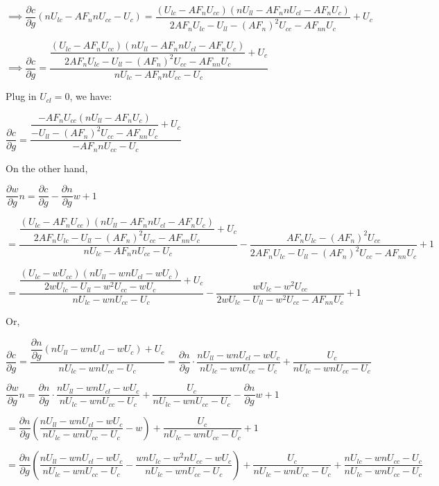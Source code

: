 \documentclass{article}
\begin{document}
$\implies \dfrac{\partial c}{\partial g}\left(nU_{lc}-AF_{n}nU_{cc}-U_{c}\right)=\dfrac{\left(U_{lc}-AF_{n}U_{cc}\right)\left(nU_{ll}-AF_{n}nU_{cl}-AF_{n}U_{c}\right)}{2AF_{n}U_{lc}-U_{ll}-\left(AF_{n}\right)^2U_{cc}-AF_{nn}U_{c}}+U_{c}$

$\implies \boxed{\dfrac{\partial c}{\partial g}=\dfrac{\dfrac{\left(U_{lc}-AF_{n}U_{cc}\right)\left(nU_{ll}-AF_{n}nU_{cl}-AF_{n}U_{c}\right)}{2AF_{n}U_{lc}-U_{ll}-\left(AF_{n}\right)^2U_{cc}-AF_{nn}U_{c}}+U_{c}}{nU_{lc}-AF_{n}nU_{cc}-U_{c}}}$

Plug in $U_{cl}=0$, we have:

$\boxed{\dfrac{\partial c}{\partial g}=\dfrac{\dfrac{-AF_{n}U_{cc}\left(nU_{ll}-AF_{n}U_{c}\right)}{-U_{ll}-\left(AF_{n}\right)^2U_{cc}-AF_{nn}U_{c}}+U_{c}}{-AF_{n}nU_{cc}-U_{c}}}$

On the other hand, 

$\dfrac{\partial w}{\partial g}n=\dfrac{\partial c}{\partial g}-\dfrac{\partial n}{\partial g}w+1$

$=\dfrac{\dfrac{\left(U_{lc}-AF_{n}U_{cc}\right)\left(nU_{ll}-AF_{n}nU_{cl}-AF_{n}U_{c}\right)}{2AF_{n}U_{lc}-U_{ll}-\left(AF_{n}\right)^2U_{cc}-AF_{nn}U_{c}}+U_{c}}{nU_{lc}-AF_{n}nU_{cc}-U_{c}}-\dfrac{AF_{n}U_{lc}-\left(AF_{n}\right)^2U_{cc}}{2AF_{n}U_{lc}-U_{ll}-\left(AF_{n}\right)^2U_{cc}-AF_{nn}U_{c}}+1$

$=\dfrac{\dfrac{\left(U_{lc}-wU_{cc}\right)\left(nU_{ll}-wnU_{cl}-wU_{c}\right)}{2wU_{lc}-U_{ll}-w^2U_{cc}-wU_{c}}+U_{c}}{nU_{lc}-wnU_{cc}-U_{c}}-\dfrac{wU_{lc}-w^2U_{cc}}{2wU_{lc}-U_{ll}-w^2U_{cc}-AF_{nn}U_{c}}+1$

Or, 

$\dfrac{\partial c}{\partial g}=\dfrac{\dfrac{\partial n}{\partial g}\left(nU_{ll}-wnU_{cl}-wU_{c}\right)+U_{c}}{nU_{lc}-wnU_{cc}-U_{c}}=\dfrac{\partial n}{\partial g}\cdot\dfrac{nU_{ll}-wnU_{cl}-wU_{c}}{nU_{lc}-wnU_{cc}-U_{c}}+\dfrac{U_{c}}{nU_{lc}-wnU_{cc}-U_{c}}$

$\dfrac{\partial w}{\partial g}n=\dfrac{\partial n}{\partial g}\cdot\dfrac{nU_{ll}-wnU_{cl}-wU_{c}}{nU_{lc}-wnU_{cc}-U_{c}}+\dfrac{U_{c}}{nU_{lc}-wnU_{cc}-U_{c}}-\dfrac{\partial n}{\partial g}w+1$

$=\dfrac{\partial n}{\partial g}\left(\dfrac{nU_{ll}-wnU_{cl}-wU_{c}}{nU_{lc}-wnU_{cc}-U_{c}}-w\right)+\dfrac{U_{c}}{nU_{lc}-wnU_{cc}-U_{c}}+1$

$=\dfrac{\partial n}{\partial g}\left(\dfrac{nU_{ll}-wnU_{cl}-wU_{c}}{nU_{lc}-wnU_{cc}-U_{c}}-\dfrac{wnU_{lc}-w^{2}nU_{cc}-wU_{c}}{nU_{lc}-wnU_{cc}-U_{c}}\right)+\dfrac{U_{c}}{nU_{lc}-wnU_{cc}-U_{c}}+\dfrac{nU_{lc}-wnU_{cc}-U_{c}}{nU_{lc}-wnU_{cc}-U_{c}}$
\end{document}
